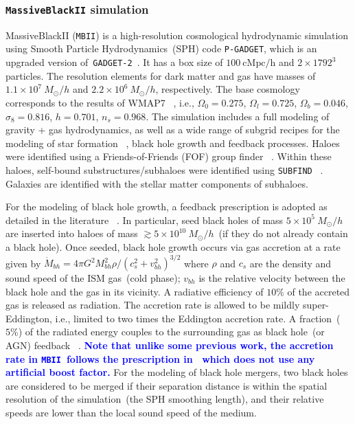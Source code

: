 \documentclass[twocolumn,trackchanges]{aastex63}
\newcommand{\mbii}{\texttt{MBII}}
\newcommand{\blue}[1]{{\textcolor{blue}{\bf #1}}}
\begin{document}
\subsubsection{\texttt{MassiveBlackII} simulation}
MassiveBlackII (\mbii) is a high-resolution cosmological hydrodynamic simulation using Smooth Particle Hydrodynamics~(SPH) code \texttt{P-GADGET}, which is an upgraded version of~\texttt{GADGET-2}~\citep{2005MNRAS.364.1105S}. It has a box size of $100~\mathrm{cMpc/h}$ and $2\times1792^3$ particles. The resolution elements for dark matter and gas have masses of $1.1\times 10^7~M_{\odot}/h$ and $2.2\times 10^6~M_{\odot}/h$, respectively. The base cosmology corresponds to the results of WMAP7 ~\citep{2011ApJS..192...18K}, i.e., $\Omega_0=0.275$, $\Omega_l=0.725$, $\Omega_b=0.046$, $\sigma_8=0.816$, $h = 0.701$, $n_s=0.968$.  The simulation includes a full modeling of gravity + gas hydrodynamics, as well as a wide range of subgrid recipes for the modeling of star formation ~\citep{2003MNRAS.339..289S}, black hole growth and feedback processes. Haloes were identified using a Friends-of-Friends (FOF) group finder ~\citep{1985ApJ...292..371D}. Within these haloes, self-bound substructures/subhaloes were identified using \texttt{SUBFIND} ~\citep{Springel2001, 2005MNRAS.364.1105S}. Galaxies are identified with the stellar matter components of subhaloes.

For the modeling of black hole growth, a feedback prescription is adopted as detailed in the literature ~\citep{2005Natur.433..604D, 2005MNRAS.361..776S}. In particular, seed black holes of mass $5\times 10^{5}~M_{\odot}/h$ are inserted into haloes of mass $\gtrsim 5\times 10^{10}~M_{\odot}/h$~(if they do not already contain a black hole). Once seeded, black hole growth occurs via gas accretion at a rate given by $\dot{M}_{bh}={4\pi G^2 M_{bh}^2 \rho}/{(c_s^2+v_{bh}^2)^{3/2}}$ where $\rho$ and $c_s$ are the density and sound speed of the ISM gas~(cold phase); $v_{bh}$ is the relative velocity between the black hole and the gas in its vicinity. A radiative efficiency of $10\%$ of the accreted gas is released as radiation. The accretion rate is allowed to be mildly super-Eddington, i.e., limited to two times the Eddington accretion rate. A fraction~($5\%$) of the radiated energy couples to the surrounding gas as black hole~(or AGN) feedback ~\citep{2005Natur.433..604D}.  \blue{Note that unlike some previous work, the accretion rate in \mbii\ follows the prescription in~\citet{Pelupessy2007} which does not use any artificial boost factor.} For the modeling of black hole mergers, two black holes are considered to be merged if their separation distance is within the spatial resolution of the simulation~(the SPH smoothing length), and their relative speeds are lower than the local sound speed of the medium.
\end{document}
